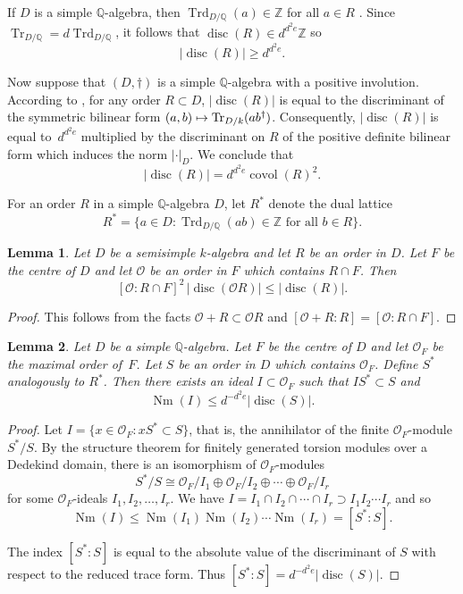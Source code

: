 \documentclass[JEP,XML,SOM,Unicode,NoFloatCountersInSection]{cedram}
\def\mto{\mathchoice{\longmapsto}{\mapsto}{\mapsto}{\mapsto}}
\newcommand{\bQ}{\mathbb{Q}}
\newcommand{\bZ}{\mathbb{Z}}
\newcommand{\cO}{\mathcal{O}}
\DeclareMathOperator{\covol}{covol}
\DeclareMathOperator{\disc}{disc}
\DeclareMathOperator{\Nm}{Nm}
\DeclareMathOperator{\Tr}{Tr}
\DeclareMathOperator{\Trd}{Trd}
\newcommand{\abs}[1]{\lvert #1 \rvert}
\newtheorem{lemma}{Lemma}[section]
\begin{document}
If $D$ is a simple $\bQ$-algebra, then $\Trd_{D/\bQ}(a) \in \bZ$ for all $a \in R$ \cite[Th.\,10.1]{Rei75}.
Since $\Tr_{D/\bQ} = d \Trd_{D/\bQ}$, it follows that $\disc(R) \in d^{d^2e} \bZ$ so
\begin{equation} \label{eqn:disc-lower-bound}
\abs{\disc(R)} \geq d^{d^2e}.
\end{equation}

Now suppose that $(D,\dag)$ is a simple $\bQ$-algebra with a positive involution.
According to \cite[Lem.\,5.6]{QRTUI}, for any order $R \subset D$, $\abs{\disc(R)}$ is equal to the discriminant of the symmetric bilinear form $(a,b) \mto \Tr_{D/k}(ab^\dag)$.
Consequently, $\abs{\disc(R)}$ is equal to~$d^{d^2e}$ multiplied by the discriminant on $R$ of the positive definite bilinear form which induces the norm $\abs{\cdot}_D$.
We conclude that
\begin{equation} \label{eqn:disc-covol}
\abs{\disc(R)} = d^{d^2e}\covol(R)^2.
\end{equation}

For an order $R$ in a simple $\bQ$-algebra $D$, let $R^*$ denote the dual lattice
\[
R^* = \{ a \in D : \Trd_{D/\bQ}(ab) \in \bZ \text{ for all } b \in R \}.
\]

\begin{lemma} \label{index-RcapF}
Let $D$ be a semisimple $k$-algebra and let $R$ be an order in $D$.
Let $F$ be the centre of $D$ and let $\cO$ be an order in $F$ which contains $R \cap F$.
Then
\[
[\cO:R \cap F]^2 \, \abs{\disc(\cO R)} \leq \abs{\disc(R)}.
\]
\end{lemma}

\begin{proof}
This follows from the facts $\cO + R \subset \cO R$ and $[\cO + R : R] = [\cO : R \cap F]$.
\end{proof}

\begin{lemma} \label{dual-ideal}
Let $D$ be a simple $\bQ$-algebra.
Let $F$ be the centre of $D$ and let $\cO_F$ be the maximal order of~$F$.
Let $S$ be an order in $D$ which contains $\cO_F$.
Define $S^*$ analogously to $R^*$.
Then there exists an ideal $I \subset \cO_F$ such that $IS^* \subset S$ and
\[
\Nm(I) \leq d^{-d^2e} \abs{\disc(S)}.
\]
\end{lemma}

\begin{proof}
Let $I = \{ x \in \cO_F : xS^* \subset S \}$, that is, the annihilator of the finite $\cO_F$\nobreakdash-mod\-ule $S^*/S$.
By the structure theorem for finitely generated torsion modules over a Dedekind domain, there is an isomorphism of $\cO_F$-modules
\[
S^*/S \cong \cO_F/I_1 \oplus \cO_F/I_2 \oplus \dotsb \oplus \cO_F/I_r
\]
for some $\cO_F$-ideals $I_1, I_2, \dotsc, I_r$.
We have $I = I_1 \cap I_2 \cap \dotsb \cap I_r \supset I_1 I_2 \dotsm I_r$ and so
\[
\Nm(I) \leq \Nm(I_1)\Nm(I_2) \dotsm \Nm(I_r) = [S^*:S].
\]

The index $[S^*:S]$ is equal to the absolute value of the discriminant of $S$ with respect to the reduced trace form. Thus $[S^*:S] = d^{-d^2e} \abs{\disc(S)}$.
\end{proof}
\end{document}
